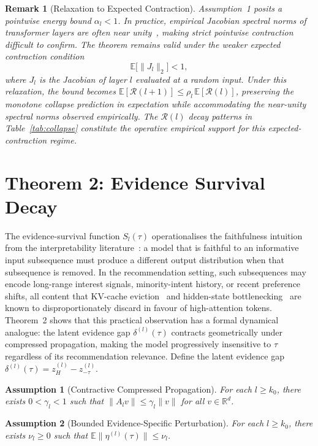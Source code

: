 \documentclass[lettersize,journal]{IEEEtran}
\newtheorem{assumption}{Assumption}
\newtheorem{remark}{Remark}
\newcommand{\R}{\mathbb{R}}
\newcommand{\E}{\mathbb{E}}
\begin{document}
\begin{remark}[Relaxation to Expected Contraction]
\label{rem:expected_contraction}
Assumption~1 posits a pointwise energy bound $\alpha_l < 1$. In practice, empirical Jacobian spectral norms of transformer layers are often near unity~\cite{kim2024compressed}, making strict pointwise contraction difficult to confirm. The theorem remains valid under the weaker \emph{expected contraction} condition
\[
\E\bigl[\|J_l\|_2\bigr] < 1,
\]
where $J_l$ is the Jacobian of layer $l$ evaluated at a random input. Under this relaxation, the bound becomes $\E[\mathcal{R}(l+1)] \le \rho_l\,\E[\mathcal{R}(l)]$, preserving the monotone collapse prediction in expectation while accommodating the near-unity spectral norms observed empirically. The $\mathcal{R}(l)$ decay patterns in Table~\ref{tab:collapse} constitute the operative empirical support for this expected-contraction regime.
\end{remark}

\section{Theorem 2: Evidence Survival Decay}

The evidence-survival function $S_l(\tau)$ operationalises the faithfulness intuition from the interpretability literature~\cite{jacovi2020towards,lyu2024towards}: a model that is faithful to an informative input subsequence must produce a different output distribution when that subsequence is removed. In the recommendation setting, such subsequences may encode long-range interest signals, minority-intent history, or recent preference shifts, all content that KV-cache eviction~\cite{zhang2024h2o} and hidden-state bottlenecking~\cite{ge2024context} are known to disproportionately discard in favour of high-attention tokens. Theorem~2 shows that this practical observation has a formal dynamical analogue: the latent evidence gap $\delta^{(l)}(\tau)$ contracts geometrically under compressed propagation, making the model progressively insensitive to $\tau$ regardless of its recommendation relevance. Define the latent evidence gap $\delta^{(l)}(\tau) = z_H^{(l)} - z_{-\tau}^{(l)}$.

\begin{assumption}[Contractive Compressed Propagation]
For each $l \ge k_0$, there exists $0<\gamma_l<1$ such that $\|A_l v\| \le \gamma_l \|v\|$ for all $v \in \R^d$.
\end{assumption}

\begin{assumption}[Bounded Evidence-Specific Perturbation]
For each $l \ge k_0$, there exists $\nu_l \ge 0$ such that $\E\|\eta^{(l)}(\tau)\| \le \nu_l$.
\end{assumption}
\end{document}
